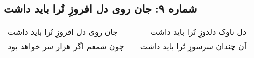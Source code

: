 \begin{center}
\section*{شماره ۹: جان روی دل افروزِ تُرا باید داشت}
\label{sec:009}
\begin{longtable}{l p{0.5cm} r}
جان روی دل افروزِ تُرا باید داشت
&&
دل ناوک دلدوزِ تُرا باید داشت
\\
چون شمعم اگر هزار سر خواهد بود
&&
آن چندان سرسوزِ تُرا باید داشت
\\
\end{longtable}
\end{center}

